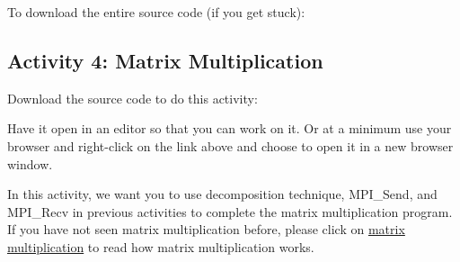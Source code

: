 \documentclass[letterpaper,10pt,openany,oneside]{sphinxmanual}
\begin{document}
To download the entire source code (if you get stuck):


\subsection{Activity 4: Matrix Multiplication}
\label{DecompositionAndActivity/DecompositionAndActivity:activity-4-matrix-multiplication}
Download the source code to do this activity:

Have it open in an editor so that you can work on it.  Or at a minimum use your browser and right-click on the link above and choose to open it in a new browser window.

In this activity, we want you to use decomposition technique, MPI\_Send, and MPI\_Recv in previous activities to complete the matrix multiplication program. If you have not seen matrix multiplication before, please click on \href{http://mathworld.wolfram.com/MatrixMultiplication.html}{matrix multiplication} to read how matrix multiplication works.
\end{document}
